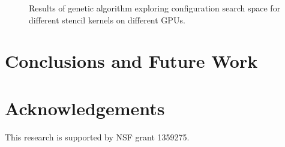 \documentclass[conference]{IEEEtran}
\begin{document}
	\begin{figure}[t]
\centering
	\label{fig:sub1}
	\hfill
	\label{fig:sub2}
	\hfill
	\label{fig:sub3}
	\hfill
	\label{fig:sub4}
	\caption{Results of genetic algorithm exploring configuration search space for different stencil kernels on different GPUs.}
\end{figure}

\section{Conclusions and Future Work}

\section*{Acknowledgements}
\begin{center}
	This research is supported by NSF grant 1359275.
\end{center}



\end{document}
